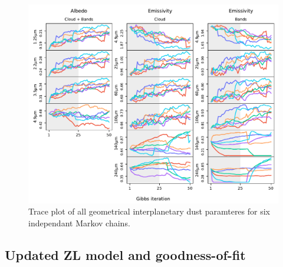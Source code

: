 \documentclass[twocolumn]{aa}
\begin{document}
\begin{figure}
    \centering
    \includegraphics[width=1\textwidth]{figs/emissivity_and_albedo_trace.pdf}
    \caption{Trace plot of all geometrical interplanetary dust paramteres for six independant Markov chains.}
    \label{fig:trace-emissivity-albedo}
\end{figure}


\subsection{Updated ZL model and goodness-of-fit}
\end{document}
